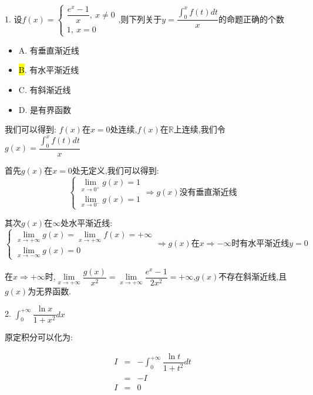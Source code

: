 1. 设$f(x)=\left\lbrace
\begin{array}{l}
	\dfrac{e^x-1}{x},\ x\neq 0\\
	1,\ x=0
\end{array}
\right. $,则下列关于$y=\dfrac{\int_{0}^{x}f(t)dt}{x}$的命题正确的个数
\begin{itemize}
	\item A. 有垂直渐近线
	\item \hl{B}. 有水平渐近线
	\item C. 有斜渐近线
	\item D. 是有界函数
\end{itemize}
\begin{solution}

	我们可以得到:  $f(x)$在$x=0$处连续,$f(x)$在$\mathbb{R}$上连续,我们令$g(x)=\dfrac{\int_{0}^{x}f(t)dt}{x}$
	
	首先$g(x)$在$x=0$处无定义,我们可以得到:  
	$$\left\lbrace
	\begin{array}{l}
		\lim\limits_{x\to 0^{+}}g(x)=1\\
		\lim\limits_{x\to 0^{-}}g(x)=1
	\end{array}
	\right. \Rightarrow g(x)\text{没有垂直渐近线}$$
	
	其次$g(x)$在$\infty$处水平渐近线:  
	$$\left\lbrace
	\begin{array}{l}
		\lim\limits_{x\to+\infty}g(x)=\lim\limits_{x\to+\infty}f(x)=+\infty\\
		\lim\limits_{x\to-\infty}g(x)=0
	\end{array}
	\right. \Rightarrow g(x)\text{在}x\Rightarrow -\infty\text{时}\text{有水平渐近线}y=0$$
	
	在$x\Rightarrow +\infty$时,$\lim\limits_{x\to+\infty}\dfrac{g(x)}{x^2}=\lim\limits_{x\to +\infty}\dfrac{e^x-1}{2x^2}=+\infty$,$g(x)$不存在斜渐近线,且$g(x)$为无界函数.
	
\end{solution}

2. $\int_{0}^{+\infty}\dfrac{\ln x}{1+x^2}dx$
\begin{solution}

	原定积分可以化为:  

	\begin{eqnarray*}
		I&=&-\int_{0}^{+\infty}\dfrac{\ln t}{1+t^2}dt\\
		&=&-I\\
		I&=&0
	\end{eqnarray*}
\end{solution}

